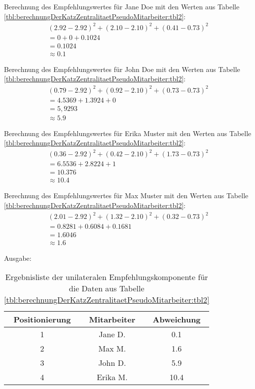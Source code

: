 Berechnung des Empfehlungswertes für Jane Doe mit den Werten aus Tabelle \ref{tbl:berechnungDerKatzZentralitaetPseudoMitarbeiter:tbl2}:
\begin{gather}
	\nonumber (2.92-2.92)^2 + (2.10-2.10)^2 + (0.41-0.73)^2\\
	\nonumber = 0 + 0 + 0.1024\\
	\nonumber = 0.1024\\
	\approx 0.1
	\label{frml:nebenrechnungen:unilateral:jane}
\end{gather}

Berechnung des Empfehlungswertes für John Doe mit den Werten aus Tabelle \ref{tbl:berechnungDerKatzZentralitaetPseudoMitarbeiter:tbl2}:
\begin{gather}
	\nonumber (0.79-2.92)^2 + (0.92-2.10)^2 + (0.73-0.73)^2\\
	\nonumber = 4.5369 + 1.3924 + 0\\
	\nonumber = 5,9293\\
	\approx 5.9
	\label{frml:nebenrechnungen:unilateral:john}
\end{gather}

Berechnung des Empfehlungswertes für Erika Muster mit den Werten aus Tabelle \ref{tbl:berechnungDerKatzZentralitaetPseudoMitarbeiter:tbl2}:
\begin{gather}
	\nonumber (0.36-2.92)^2 + (0.42-2.10)^2 + (1.73-0.73)^2\\
	\nonumber = 6.5536 + 2.8224 + 1\\
	\nonumber = 10.376\\
	\approx 10.4
	\label{frml:nebenrechnungen:unilateral:erika}
\end{gather}

Berechnung des Empfehlungswertes für Max Muster mit den Werten aus Tabelle \ref{tbl:berechnungDerKatzZentralitaetPseudoMitarbeiter:tbl2}:
\begin{gather}
	\nonumber (2.01-2.92)^2 + (1.32-2.10)^2 + (0.32-0.73)^2\\
	\nonumber = 0.8281 + 0.6084 + 0.1681\\
	\nonumber = 1.6046\\
	\approx 1.6
	\label{frml:nebenrechnungen:unilateral:max}
\end{gather}

Ausgabe:
\begin{table}[h]
	\centering
	\begin{tabular}{c|c|c}
		Positionierung & Mitarbeiter & Abweichung\\
		\hline
		1 & Jane D.  & 0.1\\
		2 & Max M.   & 1.6\\
		3 & John D.  & 5.9\\
		4 & Erika M. & 10.4
	\end{tabular}
	\caption{Ergebnisliste der unilateralen Empfehlungskomponente für die Daten aus Tabelle \ref{tbl:berechnungDerKatzZentralitaetPseudoMitarbeiter:tbl2}}
	\label{tbl:nebenrechnungen:unilateral:ausgabe}
\end{table}